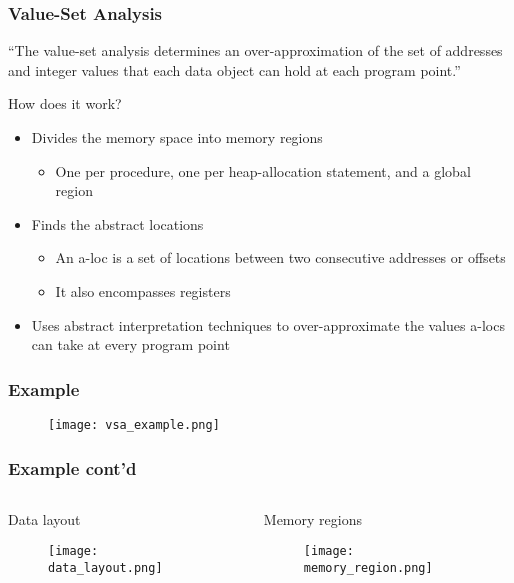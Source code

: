 \documentclass[10pt, xcolor={dvipsnames}]{beamer}
\begin{document}
\begin{frame}
	\frametitle{Value-Set Analysis}
	\begin{exampleblock}{}
		{\large “The \alert{value-set analysis} determines an over-approximation of the set of addresses and integer values that each data object can hold at each program point.”}
		\vskip5mm
		\hspace*{}
	\end{exampleblock}
	\hfill
	\begin{block}{How does it work?}
		\begin{itemize}
			\item Divides the memory space into memory regions
			\begin{itemize}
				\item One per procedure, one per heap-allocation statement, and a global region
			\end{itemize}
			\item Finds the abstract locations
			\begin{itemize}
				\item An a-loc is a set of locations between two consecutive addresses or offsets
				\item It also encompasses registers
			\end{itemize}
			\item Uses abstract interpretation techniques to over-approximate the values a-locs can take at every program point
		\end{itemize}
	\end{block}
\end{frame}

\begin{frame}
	\frametitle{Example}
	\begin{figure}
		\centering
		\texttt{[image: vsa\_example.png]}
	\end{figure}
\end{frame}

\begin{frame}
	\frametitle{Example cont'd}
	\begin{columns}[T] %
		\begin{column}{.48\textwidth}
			\begin{block}{Data layout}
				\begin{figure}
					\centering
					\texttt{[image: data\_layout.png]}
				\end{figure}
			\end{block}
		\end{column}%
		\hfill%
		\begin{column}{.48\textwidth}
			\begin{block}{Memory regions}
				\begin{figure}
					\centering
					\texttt{[image: memory\_region.png]}
				\end{figure}
			\end{block}
		\end{column}%
	\end{columns}
\end{frame}
\end{document}
